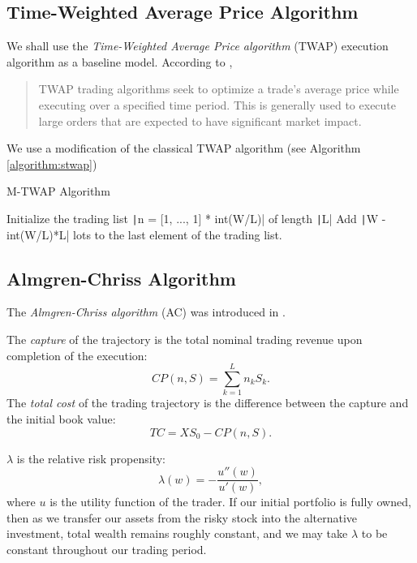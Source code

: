     \subsection{Time-Weighted Average Price Algorithm}
        We shall use the \emph{Time-Weighted Average Price algorithm} (TWAP) execution algorithm as a baseline model.
        According to \cite{TWAP}, 
        \begin{quote}
            TWAP trading algorithms seek to optimize a trade's average price while executing over a specified time period. This is 
            generally used to execute large orders that are expected to have significant market impact.
        \end{quote}
        We use a modification of the classical TWAP algorithm (see Algorithm \ref{algorithm:stwap})
        \begin{algorithm}
            \caption{M-TWAP Algorithm}
            \begin{algorithmic}
                \State Initialize the trading list \texttt|n = [1, ..., 1] * int(W/L)| of length \texttt|L|
                \State Add \texttt|W - int(W/L)*L| lots to the last element of the trading list.
            \end{algorithmic}
            \label{algorithm:stwap}
        \end{algorithm}

    \subsection{Almgren-Chriss Algorithm}
        The \emph{Almgren-Chriss algorithm} (AC) was introduced in \cite{Almgren2000}.

        \begin{definition}
            The \emph{capture} of the trajectory is the total nominal trading revenue upon completion of the execution:
            \begin{equation*}
                CP(n, S) = \sum_{k=1}^{L} n_kS_k.
            \end{equation*}
            The \emph{total cost} of the trading trajectory is the difference between the capture and the initial book value:
            \begin{equation*}
                TC = XS_0 - CP(n, S).
            \end{equation*}
        \end{definition}
        \noindent$\lambda$ is the relative risk propensity:
        \begin{equation*}
            \lambda(w) = -\frac{u''(w)}{u'(w)},
        \end{equation*}
        where $u$ is the utility function of the trader. If our initial portfolio is fully owned, then as we transfer our assets from the 
        risky stock into the alternative investment, total wealth remains roughly constant, and we may take $\lambda$ to be constant throughout our trading period.
        
